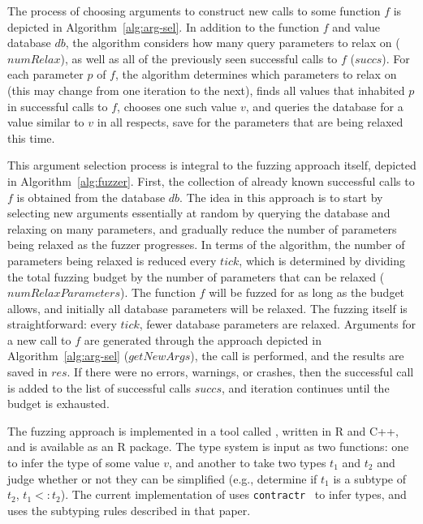 \documentclass[sigplan,anonymous,review]{acmart}
\begin{document}
The process of choosing arguments to construct new calls to some function $f$ is depicted in Algorithm~\ref{alg:arg-sel}.
In addition to the function $f$ and value database $db$, the algorithm considers how many query parameters to relax on ($numRelax$), as well as all of the previously seen successful calls to $f$ ($succs$).
For each parameter $p$ of $f$, the algorithm determines which parameters to relax on (this may change from one iteration to the next), finds all values that inhabited $p$ in successful calls to $f$, chooses one such value $v$, and queries the database for a value similar to $v$ in all respects, save for the parameters that are being relaxed this time.

This argument selection process is integral to the fuzzing approach itself, depicted in Algorithm~\ref{alg:fuzzer}.
First, the collection of already known successful calls to $f$ is obtained from the database $db$.
The idea in this approach is to start by selecting new arguments essentially at random by querying the database and relaxing on many parameters, and gradually reduce the number of parameters being relaxed as the fuzzer progresses.
In terms of the algorithm, the number of parameters being relaxed is reduced every $tick$, which is determined by dividing the total fuzzing budget by the number of parameters that can be relaxed ($numRelaxParameters$).
The function $f$ will be fuzzed for as long as the budget allows, and initially all database parameters will be relaxed.
The fuzzing itself is straightforward: every $tick$, fewer database parameters are relaxed.
Arguments for a new call to $f$ are generated through the approach depicted in Algorithm~\ref{alg:arg-sel} ($getNewArgs$), the call is performed, and the results are saved in $res$.
If there were no errors, warnings, or crashes, then the successful call is added to the list of successful calls $succs$, and iteration continues until the budget is exhausted.



The fuzzing approach is implemented in a tool called \tool, written in R and C++, and is available as an R package.
The type system is input as two functions: one to infer the type of some value $v$, and another to take two types $t_1$ and $t_2$ and judge whether or not they can be simplified (e.g., determine if $t_1$ is a subtype of $t_2$, $t_1 <: t_2$). 
The current implementation of \tool uses {\tt contractr}~\cite{turcotte2020designing} to infer types, and uses the subtyping rules described in that paper.
 
\end{document}
